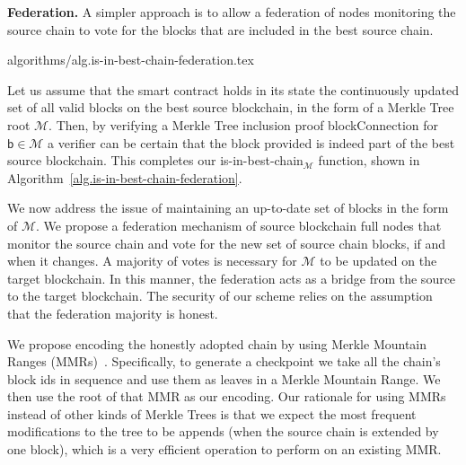 \noindent
\textbf{Federation.}
A simpler approach is to allow a federation of nodes monitoring the source chain to vote for the blocks that are included in the best source chain.

{algorithms/alg.is-in-best-chain-federation.tex}

Let us assume that the smart contract holds in its state the continuously updated set of all valid blocks on the best source blockchain, in the form of a Merkle Tree root $\mathcal{M}$. Then, by verifying a Merkle Tree inclusion proof \textsf{blockConnection} for $\textsf{b} \in \mathcal{M}$ a verifier can be certain that the block provided is indeed part of the best source blockchain. This completes our {\sf is-in-best-chain}$_\mathcal{M}$ function, shown in Algorithm~\ref{alg.is-in-best-chain-federation}.

We now address the issue of maintaining an up-to-date set of blocks in the form of $\mathcal{M}$. We propose a federation mechanism of source blockchain full nodes that monitor the source chain and vote for the new set of source chain blocks, if and when it changes. A majority of votes is necessary for $\mathcal{M}$ to be updated on the target blockchain. In this manner, the federation acts as a bridge from the source to the target blockchain. The security of our scheme relies on the assumption that the federation majority is honest.

We propose encoding the honestly adopted chain by using Merkle Mountain Ranges (MMRs)~\cite{flyclient}. Specifically, to generate a checkpoint we take all the chain's block ids in sequence and use them as leaves in a Merkle Mountain Range. We then use the root of that MMR as our encoding. Our rationale for using MMRs instead of other kinds of Merkle Trees is that we expect the most frequent modifications to the tree to be appends (when the source chain is extended by one block), which is a very efficient operation to perform on an existing MMR.
